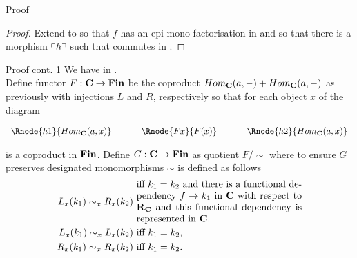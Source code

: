 \iffalse
\begin{frame} {Proof}
\begin{proof} Extend \catcw to \catcpw so that $f$ has an epi-mono factorisation in \catcpw
and so that there  is a morphism $\left\ulcorner h\right\urcorner$ such that
commutes in \catcp.  
\end{proof}
\end{frame}

\begin{frame}{Proof cont. 1}
We have \fgsourcediagram in \catc. \\
\medskip
Define functor $F: \textbf{C} \rightarrow \textbf{Fin}$ be the coproduct $Hom_{\textbf{C}}(a,-) + Hom_{\textbf{C}}(a,-)$
as previously with injections $L$ and $R$, respectively so that
for each object $x$ of \catcw the diagram
\begin{center}
$
\begin{array}{c p{0.5cm} c p{0.5cm} c  }
\Rnode{h1}{Hom_{\catc}(a,x)}  &&\Rnode{Fx}{F(x)}  &&   \Rnode{h2}{Hom_{\catc}(a,x)}       
\end{array} 
$
\end{center}
is a coproduct in $\textbf{Fin}$.
\medskip
Define $G: \textbf{C} \rightarrow \textbf{Fin}$ as quotient $F/\sim$ where 
to ensure $G$ preserves designated monomorphisms  $\sim$ is defined as follows
\begin{align*}
L_x(k_1) \sim_x R_x(k_2) & \mbox{ \parbox{6cm}{iff  $k_1=k_2$ and there is a functional dependency 
$f \morph k_1$ in \catcw with respect to $\reqtc$ and  this functional dependency is represented in \catc.}}\\
L_x(k_1) \sim_x L_x(k_2) & \mbox{ iff $k_1 = k_2$,} \\
R_x(k_1) \sim_x R_x(k_2) & \mbox{ iff $k_1 = k_2$.} \\
\end{align*} 
\end{frame}

